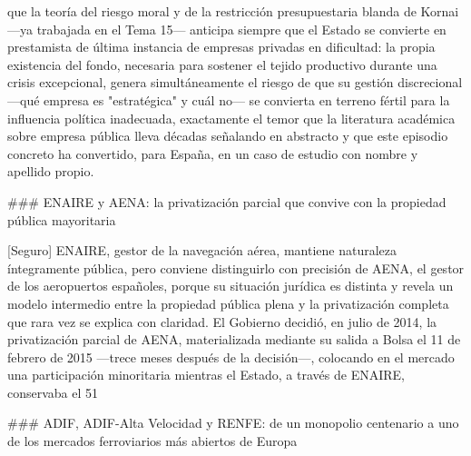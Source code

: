\documentclass[10pt,a4paper]{article}
\newcounter{anexo}
\begin{document}
que la teoría del riesgo moral y de la restricción presupuestaria blanda de Kornai —ya trabajada en el Tema 15— anticipa siempre que el Estado se convierte en prestamista de última instancia de empresas privadas en dificultad: la propia existencia del fondo, necesaria para sostener el tejido productivo durante una crisis excepcional, genera simultáneamente el riesgo de que su gestión discrecional —qué empresa es "estratégica" y cuál no— se convierta en terreno fértil para la influencia política inadecuada, exactamente el temor que la literatura académica sobre empresa pública lleva décadas señalando en abstracto y que este episodio concreto ha convertido, para España, en un caso de estudio con nombre y apellido propio.

### ENAIRE y AENA: la privatización parcial que convive con la propiedad pública mayoritaria

[Seguro] ENAIRE, gestor de la navegación aérea, mantiene naturaleza íntegramente pública, pero conviene distinguirlo con precisión de AENA, el gestor de los aeropuertos españoles, porque su situación jurídica es distinta y revela un modelo intermedio entre la propiedad pública plena y la privatización completa que rara vez se explica con claridad. El Gobierno decidió, en julio de 2014, la privatización parcial de AENA, materializada mediante su salida a Bolsa el 11 de febrero de 2015 —trece meses después de la decisión—, colocando en el mercado una participación minoritaria mientras el Estado, a través de ENAIRE, conservaba el 51%

### ADIF, ADIF-Alta Velocidad y RENFE: de un monopolio centenario a uno de los mercados ferroviarios más abiertos de Europa
\end{document}
